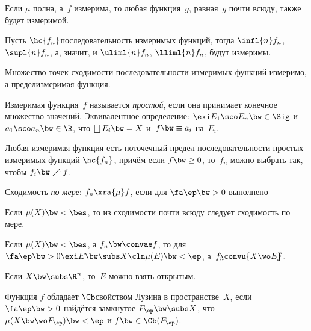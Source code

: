 \documentclass[a4paper]{article}
\begin{document}
\begin{stm}
Если $\mu$ полна, а~$f$ измерима, то любая функция~$g$, равная~$g$ почти всюду, также будет измеримой.
\end{stm}

\begin{stm}
  Пусть $\hc{f_n}$\т последовательность измеримых функций, тогда $\infl{n}f_n$, $\supl{n}f_n$, а, значит, и
  $\uliml{n} f_n$, $\lliml{n} f_n$, будут измеримы.
\end{stm}

\begin{theorem}
  Множество точек сходимости последовательности измеримых функций измеримо,
  а предел\т измеримая функция.
\end{theorem}

\begin{df}
  Измеримая функция~$f$ называется \emph{простой}, если она принимает конечное множество значений.
  Эквивалентное определение: $\exi E_1\sco E_n \bw\in \Sig$ и $a_1\sco a_n \bw\in \R$, что
  $\bigsqcup E_i \bw= X$ и~$f \bw\equiv a_i$ на~$E_i$.
\end{df}

\begin{theorem}
  Любая измеримая функция есть поточечный предел последовательности простых измеримых
  функций $\hc{f_n}$, причём если $f \bw\ge 0$, то~$f_n$ можно выбрать так,
  чтобы $f_i \bw\nearrow f$.
\end{theorem}

\begin{df}
  Сходимость \emph{по мере}: $f_n \xra{\mu} f$, если для $\fa\ep \bw> 0$ выполнено
\end{df}

\begin{theorem}
  Если $\mu(X) \bw< \bes$, то из сходимости почти всюду следует сходимость по мере.
\end{theorem}

\begin{theorem}[Егорова]
  Если $\mu(X) \bw< \bes$, а $f_n \bw\convae f$, то для
  $\fa\ep \bw>0 \exi E \bw\subs X\cln \mu(E) \bw< \ep$, а~$f_n \mskip-10mu \convu{X\wo E}\mskip-10mu f$.
\end{theorem}

\begin{note}
  Если $X \bw\subs \R^n$, то~$E$ можно взять открытым.
\end{note}

\begin{df}
  Функция $f$ обладает $\Cb$\д свойством Лузина в пространстве~$X$,
  если $\fa\ep \bw> 0$ найдётся замкнутое $F_\ep \bw\subs X$, что
  $\mu(X \bw\wo F_\ep)\bw< \ep$ и $f \bw\in \Cb(F_\ep)$.
\end{df}
\end{document}
